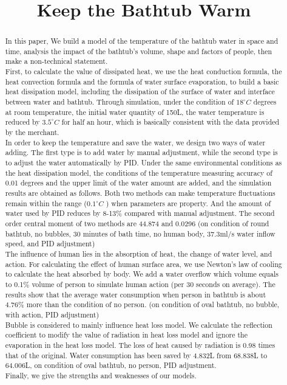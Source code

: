 \documentclass{mcmthesis}
\title{}
\date{}
\begin{document}
\begin{abstract}%


\title{Keep the Bathtub Warm}
\indent In this paper,  We build a model of the temperature of the bathtub water in space and time, analysis the impact of the bathtub's volume, shape and factors of people, then make a non-technical statement.\\
\indent
First, to calculate the value of dissipated heat, we use the heat conduction formula, the heat convection formula and the formula of water surface evaporation, to build a basic heat dissipation model,  including the dissipation of the surface of water and interface between water and bathtub. Through simulation, under the condition of $18^{\circ}C$ degrees at room temperature, the initial water quantity of 150L,  the water temperature is reduced by $3.5^{\circ}C$ for half an hour, which is basically consistent with the data provided by the merchant.\\ 
\indent In order to keep the temperature and save the water, we design two ways of water adding. The first type is to add water by manual adjustment, while the second type is to adjust the water automatically by PID. Under the same environmental conditions as the heat dissipation model, the conditions of the temperature measuring accuracy of 0.01 degrees and the upper limit of the water amount are added, and the simulation results are obtained as follows. Both two methods can make temperature fluctuations remain within the range ($0.1^{\circ}C$ ) when parameters are property. And the amount of water used by PID reduces by 8-13\% compared with manual adjustment. The second order central moment of two methods are 44.874 and 0.0296 (on condition of round bathtub, no bubbles, 30 minutes of bath time, no human body, 37.3ml/s water inflow speed, and PID adjustment)\\
\indent The influence of human lies in the absorption of heat, the change of water level, and action. For calculating the effect of human surface area, we use Newton's law of cooling to calculate the heat absorbed by body.  We add a water overflow which volume equals to 0.1\% volume of person to simulate human action (per 30 seconds on average). The results show that the average water consumption when person in bathtub is about 4.76\% more than the condition of no person. (on condition of oval bathtub, no bubble, with action, PID adjustment)\\
\indent
Bubble is considered to  mainly influence heat loss model. We calculate the reflection coefficient to modify the value of radiation in heat loss model and ignore the evaporation in the heat loss model. The loss of heat caused by radiation is 0.98 times that of the original. Water consumption has been saved by 4.832L from 68.838L to 64.006L, on condition of oval bathtub, no person, PID adjustment.\\
\indent Finally, we give the strengths and weaknesses of our models. \\


\end{abstract}
\end{document}
